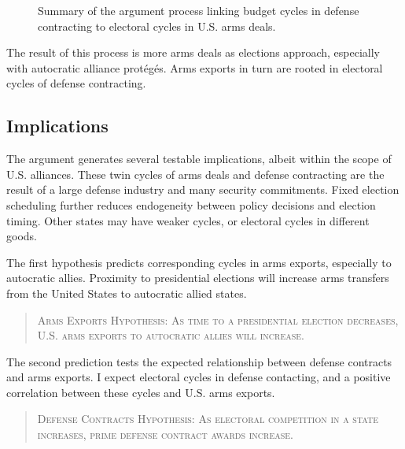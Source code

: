 \documentclass[12pt]{article}
\begin{document}
\begin{figure}[htpb]
\caption{Summary of the argument process linking budget cycles in defense contracting to electoral cycles in U.S. arms deals.}
\label{fig:arg-process}
\end{figure}



The result of this process is more arms deals as elections approach, especially with autocratic alliance prot{\'e}g{\'e}s.
Arms exports in turn are rooted in electoral cycles of defense contracting.



\subsection{Implications}



The argument generates several testable implications, albeit within the scope of U.S. alliances. 
These twin cycles of arms deals and defense contracting are the result of a large defense industry and many security commitments.
Fixed election scheduling further reduces endogeneity between policy decisions and election timing. 
Other states may have weaker cycles, or electoral cycles in different goods.


The first hypothesis predicts corresponding cycles in arms exports, especially to autocratic allies.
Proximity to presidential elections will increase arms transfers from the United States to autocratic allied states. 


\begin{quote}
\textsc{Arms Exports Hypothesis: As time to a presidential election decreases, U.S. arms exports to autocratic allies will increase.}
\end{quote}


The second prediction tests the expected relationship between defense contracts and arms exports. 
I expect electoral cycles in defense contacting, and a positive correlation between these cycles and U.S. arms exports.


\begin{quote}
\textsc{Defense Contracts Hypothesis: As electoral competition in a state increases, prime defense contract awards increase.}
\end{quote}
\end{document}
